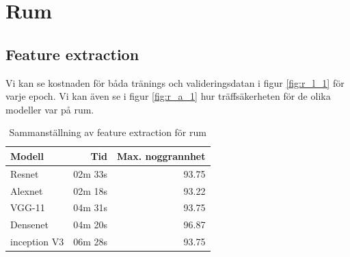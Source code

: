 \documentclass[]{kththesis}
\begin{document}
\section{Rum}

\subsection{Feature extraction}
Vi kan se kostnaden för båda tränings och valideringsdatan i figur \ref{fig:r_l_1} för varje epoch. Vi kan även se i figur \ref{fig:r_a_1} hur träffsäkerheten för de olika modeller var på rum.

\begin{table}
  \centering
  \begin{tabular}{|l|r|r|}
    Modell & Tid & Max. noggrannhet \\ 
    \hline
    Resnet       & 02m 33s & 93.75 \\
    Alexnet      & 02m 18s & 93.22 \\
    VGG-11       & 04m 31s & 93.75 \\
    Densenet     & 04m 20s & 96.87 \\
    inception V3 & 06m 28s & 93.75 \\
  \end{tabular}
  \caption{Sammanställning av feature extraction för rum}
\end{table}
\end{document}
